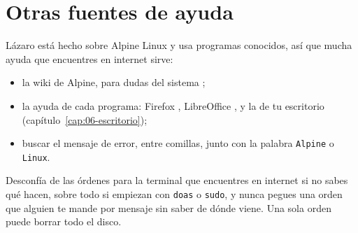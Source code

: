 \section{Otras fuentes de ayuda}

Lázaro está hecho sobre Alpine Linux y usa programas conocidos, así que
mucha ayuda que encuentres en internet sirve:
\begin{itemize}
  \item la wiki de Alpine, para dudas del sistema \cite{alpine-wiki};
  \item la ayuda de cada programa: Firefox \cite{firefox-ayuda},
        LibreOffice \cite{libreoffice-ayuda}, y la de tu escritorio
        (capítulo~\ref{cap:06-escritorio});
  \item buscar el mensaje de error, entre comillas, junto con la palabra
        \texttt{Alpine} o \texttt{Linux}.
\end{itemize}

\begin{cuidado}
Desconfía de las órdenes para la terminal que encuentres en internet si no
sabes qué hacen, sobre todo si empiezan con \texttt{doas} o \texttt{sudo},
y nunca pegues una orden que alguien te mande por mensaje sin saber de
dónde viene. Una sola orden puede borrar todo el disco.
\end{cuidado}

\fuentes
